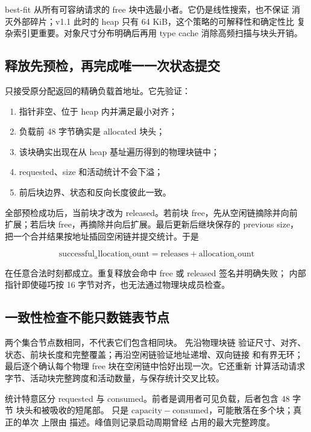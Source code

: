 best-fit 从所有可容纳请求的 free 块中选最小者。它仍是线性搜索，也不保证
消灭外部碎片；v1.1 此时的 heap 只有 64 KiB，这个策略的可解释性和确定性比
复杂索引更重要。对象尺寸分布明确后再用 type cache 消除高频扫描与块头开销。

\subsection{释放先预检，再完成唯一一次状态提交}

 只接受原分配返回的精确负载首地址。它先验证：

\begin{enumerate}[label=\arabic*.]
  \item 指针非空、位于 heap 内并满足最小对齐；
  \item 负载前 48 字节确实是 allocated 块头；
  \item 该块确实出现在从 heap 基址遍历得到的物理块链中；
  \item requested、size 和活动统计不会下溢；
  \item 前后块边界、状态和反向长度彼此一致。
\end{enumerate}

全部预检成功后，当前块才改为 released。若前块 free，先从空闲链摘除并向前
扩展；若后块 free，再摘除并向后扩展。最后更新后继块保存的 previous size，
把一个合并结果按地址插回空闲链并提交统计。于是

\[
  \mathrm{successful_allocation_count}
  =
  \mathrm{releases}
  +
  \mathrm{allocation_count}
\]

在任意合法时刻都成立。重复释放会命中 free 或 released 签名并明确失败；
内部指针即使碰巧按 16 字节对齐，也无法通过物理块成员检查。

\subsection{一致性检查不能只数链表节点}

两个集合节点数相同，不代表它们包含相同块。 先沿物理块链
验证尺寸、对齐、状态、前块长度和完整覆盖；再沿空闲链验证地址递增、双向链接
和有界无环；最后逐个确认每个物理 free 块在空闲链中恰好出现一次。它还重新
计算活动请求字节、活动块完整跨度和活动数量，与保存统计交叉比较。

统计特意区分 requested 与 consumed。前者是调用者可见负载，后者包含 48 字节
块头和被吸收的短尾部。 只是
\(\mathrm{capacity}-\mathrm{consumed}\)，可能散落在多个块；真正的单次
上限由  描述。峰值则记录启动周期曾经
占用的最大完整跨度。

